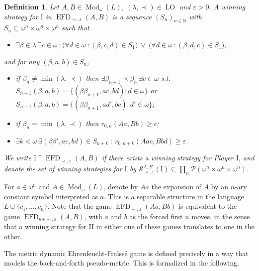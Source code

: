 \documentclass[12pt]{amsart}
\newtheorem{definition}[theorem]{Definition}
\DeclareMathOperator{\EFD}{EFD}
\DeclareMathOperator{\Mod}{Mod}
\DeclareMathOperator{\LO}{LO}
\begin{document}
\begin{definition}\label{definition: metric EFD winning strategy for I}
    Let $A,B\in \Mod_\omega(L)$, $(\lambda,\prec)\in \LO$ and $\varepsilon>0$. A winning strategy for $\mathrm{I}$ in $\EFD_{\prec,\varepsilon}(A,B)$ is a sequence $(S_n)_{n\in\mathbb N}$ with $S_n\subseteq \omega^n\times\omega^n\times\omega^n$ such that 
    \begin{itemize}
        \item $\exists \beta\in\lambda \ \exists c\in\omega ~\colon \big(\forall d\in\omega ~\colon (\beta,c,d)\in S_1\big)\ \vee \ \big(\forall d\in\omega~\colon (\beta,d,c)\in S_1\big)$,
    \end{itemize}
    and for any $(\beta,a,b)\in S_n$,
    \begin{itemize}
        \item if $\beta_n\neq \min(\lambda,\prec)$ then $\exists\beta_{n+1}\prec\beta_n\ \exists c\in \omega $ s.t. $ S_{n+1}(\beta,a,b)=\{(\beta\beta_{n+1},ac,bd)\colon d\in\omega\}$ or $S_{n+1}(\beta,a,b)=\{(\beta\beta_{n+1},ad',bc)\colon d'\in\omega\};$
        \item if $\beta_n=\min(\lambda,\prec)$ then $r_{0,n}(Aa,Bb)\geq\epsilon$;
        \item $\exists k<\omega\ \exists (\beta\beta',ac,bd)\in S_{n+k}~\colon \ r_{0,n+k}(Aac,Bbd)\geq\varepsilon$.
    \end{itemize}
    We write $\mathrm{I}\uparrow\EFD_{\prec,\varepsilon}(A,B)$ if there exists a winning strategy for Player $\mathrm{I}$, and denote the set of winning strategies for $\mathrm{I}$ by $\mathcal{S}_{\prec,\varepsilon}^{A,B}(\mathrm{I})\subseteq \prod_n\mathcal{P}(\omega^n\times\omega^n\times\omega^n)$.
\end{definition}

For $a\in \omega^n$ and $A\in\Mod_\omega(L)$, denote by $Aa$ the expansion of $A$ by an $n$-ary constant symbol interpreted as $a$. This is a separable structure in the language $L\cup\{c_1,\dots,c_n\}$. Note that the game $\EFD_{\prec,\varepsilon}(Aa,Bb)$ is equivalent to the game $\EFD_{n+\prec,\varepsilon}(A,B)$, with $a$ and $b$ as the forced first $n$ moves, in the sense that a winning strategy for II in either one of these games translates to one in the other.

The metric dynamic Ehrenfeucht-Fra\"iss\'e game is defined precisely in a way that models the back-and-forth pseudo-metric. This is formalized in the following.
\end{document}
